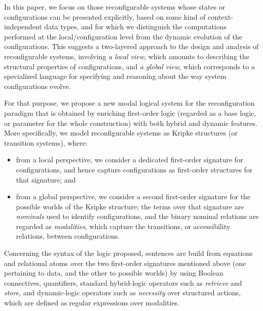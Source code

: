 \documentclass[a4paper,UKenglish,cleveref,autoref]{lipics-v2019}
\begin{document}
In this paper, we focus on those reconfigurable systems
whose states or configurations can be presented explicitly, based on some kind of context-independent data types,
and for which we distinguish the computations performed at the local/configuration level from the dynamic evolution of the configurations.
This suggests a two-layered approach to the design and analysis of reconfigurable systems, involving
\emph{a local view}, which amounts to describing the structural properties of configurations, and
\emph{a global view}, which corresponds to a specialized language for specifying and reasoning about the way system configurations evolve.

For that purpose, we propose a new modal logical system for the reconfiguration paradigm that is obtained by enriching first-order logic (regarded as a base logic, or parameter for the whole construction) with both hybrid and dynamic features.
More specifically, we model reconfigurable systems as Kripke structures (or transition systems), where:
\begin{itemize}
  
\item from a local perspective, we consider a dedicated first-order signature for configurations, and hence capture configurations as first-order structures for that signature; and

\item from a global perspective, we consider a second first-order signature for the possible worlds of the Kripke structure;
  the terms over that signature are \emph{nominals} used to identify configurations, and the binary nominal relations are regarded as \emph{modalities}, which capture the transitions, or accessibility relations, between configurations.
  
\end{itemize}
Concerning the syntax of the logic proposed, sentences are build from equations and relational atoms over the two first-order signatures mentioned above (one pertaining to data, and the other to possible worlds) by using Boolean connectives, quantifiers, standard hybrid-logic operators such as \emph{retrieve} and \emph{store}, and dynamic-logic operators such as \emph{necessity} over structured actions, which are defined as regular expressions over modalities.
\end{document}
